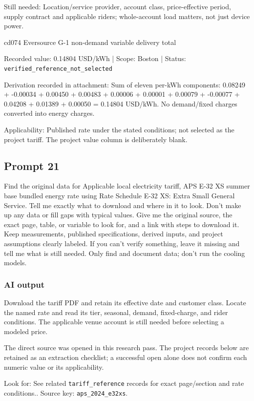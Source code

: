 Still needed: Location/service provider, account class, price-effective period, supply contract and applicable riders; whole-account load matters, not just device power.

cd074  Eversource G-1 non-demand variable delivery total

Recorded value: 0.14804 USD/kWh | Scope: Boston | Status: \nolinkurl{verified_reference_not_selected}

Derivation recorded in attachment: Sum of eleven per-kWh components: 0.08249 + -0.00034 + 0.00450 + 0.00483 + 0.00006 + 0.00001 + 0.00079 + -0.00077 + 0.04208 + 0.01389 + 0.00050 = 0.14804 USD/kWh. No demand/fixed charges converted into energy charges.

Applicability: Published rate under the stated conditions; not selected as the project tariff. The project value column is deliberately blank.

\subsection*{Prompt 21}
Find the original data for Applicable local electricity tariff, APS E-32 XS summer base bundled energy rate using Rate Schedule E-32 XS: Extra Small General Service. Tell me exactly what to download and where in it to look. Don’t make up any data or fill gaps with typical values. Give me the original source, the exact page, table, or variable to look for, and a link with steps to download it. Keep measurements, published specifications, derived inputs, and project assumptions clearly labeled. If you can’t verify something, leave it missing and tell me what is still needed. Only find and document data; don’t run the cooling models.

\subsubsection*{AI output}
Download the tariff PDF and retain its effective date and customer class. Locate the named rate and read its tier, seasonal, demand, fixed-charge, and rider conditions. The applicable venue account is still needed before selecting a modeled price.

The direct source was opened in this research pass. The project records below are retained as an extraction checklist; a successful open alone does not confirm each numeric value or its applicability.

Look for: See related \nolinkurl{tariff_reference} records for exact page/section and rate conditions.. Source key: \nolinkurl{aps_2024_e32xs}.


